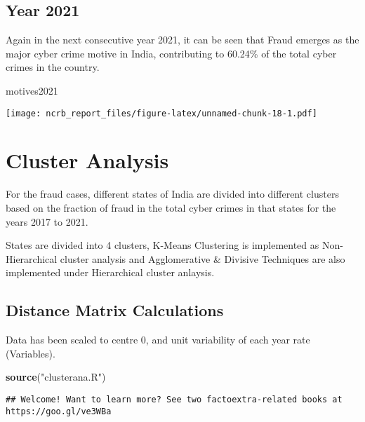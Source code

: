 \documentclass[
  12,
  a4paper,
]{report}
\newenvironment{Shaded}{\begin{snugshade}}{\end{snugshade}}
\newcommand{\FunctionTok}[1]{\textcolor[rgb]{0.13,0.29,0.53}{\textbf{#1}}}
\newcommand{\NormalTok}[1]{#1}
\newcommand{\StringTok}[1]{\textcolor[rgb]{0.31,0.60,0.02}{#1}}
\begin{document}
\hypertarget{year-2021-1}{%
\subsection{Year 2021}\label{year-2021-1}}

Again in the next consecutive year 2021, it can be seen that Fraud
emerges as the major cyber crime motive in India, contributing to
60.24\% of the total cyber crimes in the country.

\begin{Shaded}
\begin{Highlighting}[]
\NormalTok{motives2021}
\end{Highlighting}
\end{Shaded}

\texttt{[image: ncrb\_report\_files/figure-latex/unnamed-chunk-18-1.pdf]}

\hypertarget{cluster-analysis}{%
\section{Cluster Analysis}\label{cluster-analysis}}

For the fraud cases, different states of India are divided into
different clusters based on the fraction of fraud in the total cyber
crimes in that states for the years 2017 to 2021.

States are divided into 4 clusters, K-Means Clustering is implemented as
Non-Hierarchical cluster analysis and Agglomerative \& Divisive
Techniques are also implemented under Hierarchical cluster anlaysis.

\hypertarget{distance-matrix-calculations}{%
\subsection{Distance Matrix
Calculations}\label{distance-matrix-calculations}}

Data has been scaled to centre 0, and unit variability of each year rate
(Variables).

\begin{Shaded}
\begin{Highlighting}[]
\FunctionTok{source}\NormalTok{(}\StringTok{"clusterana.R"}\NormalTok{)}
\end{Highlighting}
\end{Shaded}

\begin{verbatim}
## Welcome! Want to learn more? See two factoextra-related books at https://goo.gl/ve3WBa
\end{verbatim}
\end{document}
